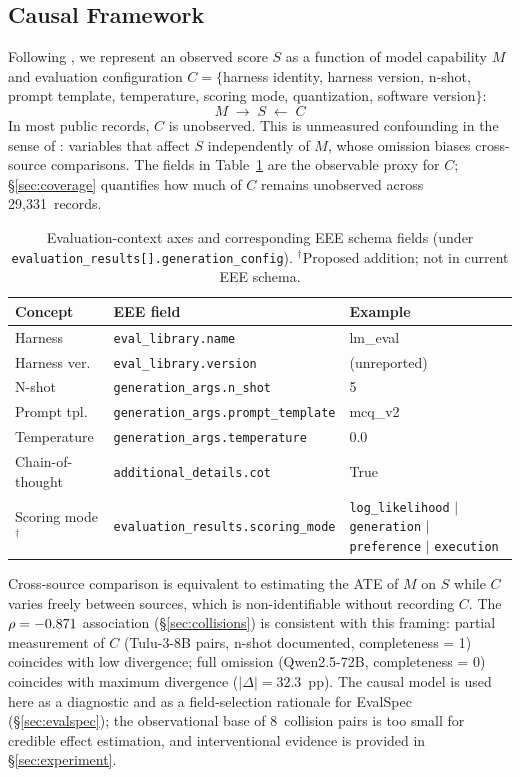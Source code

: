 \documentclass[11pt]{article}
\begin{document}
\subsection{Causal Framework}\label{sec:causal}

Following \citet{pearl-2009-causality}, we represent an observed
score $S$ as a function of model capability $M$ and evaluation
configuration $C = \{$harness identity, harness version, n-shot,
prompt template, temperature, scoring mode, quantization,
software version$\}$:
\begin{equation*}
  M \;\rightarrow\; S \;\leftarrow\; C
\end{equation*}
In most public records, $C$ is unobserved. This is unmeasured
confounding in the sense of \citet{cinelli2020sensitivity}:
variables that affect $S$ independently of $M$, whose omission
biases cross-source comparisons. The fields in
Table~\ref{tab:terminology} are the observable proxy for $C$;
\S\ref{sec:coverage} quantifies how much of $C$ remains
unobserved across 29,331~records.

\begin{table}[t]
\centering
\small
\setlength{\tabcolsep}{3pt}
\caption{Evaluation-context axes and corresponding EEE schema
fields (under \texttt{evaluation\_results[].generation\_config}).
$^\dagger$Proposed addition; not in current EEE schema.}
\label{tab:terminology}
\begin{tabular}{lll}
\toprule
\textbf{Concept} & \textbf{EEE field} & \textbf{Example} \\
\midrule
Harness        & \texttt{eval\_library.name}    & lm\_eval \\
Harness ver.   & \texttt{eval\_library.version} & (unreported) \\
N-shot         & \texttt{generation\_args.n\_shot} & 5 \\
Prompt tpl.    & \texttt{generation\_args.prompt\_template} & mcq\_v2 \\
Temperature    & \texttt{generation\_args.temperature} & 0.0 \\
Chain-of-thought & \texttt{additional\_details.cot} & True \\
Scoring mode$^\dagger$ & \texttt{evaluation\_results.scoring\_mode}
  & \texttt{log\_likelihood} $|$ \texttt{generation} $|$
    \texttt{preference} $|$ \texttt{execution} \\
\bottomrule
\end{tabular}
\end{table}

Cross-source comparison is equivalent to estimating the ATE of
$M$ on $S$ while $C$ varies freely between sources, which is
non-identifiable without recording $C$. The
$\rho = -0.871{}$ association (\S\ref{sec:collisions}) is
consistent with this framing: partial measurement of $C$
(Tulu-3-8B pairs, n-shot documented, completeness = 1) coincides with
low divergence; full omission (Qwen2.5-72B, completeness = 0)
coincides with maximum divergence ($|\Delta| = 32.3$~pp). The
causal model is used here as a diagnostic and as a field-selection
rationale for EvalSpec (\S\ref{sec:evalspec}); the observational
base of 8~collision pairs is too small for credible effect
estimation, and interventional evidence is provided in
\S\ref{sec:experiment}.
\end{document}
